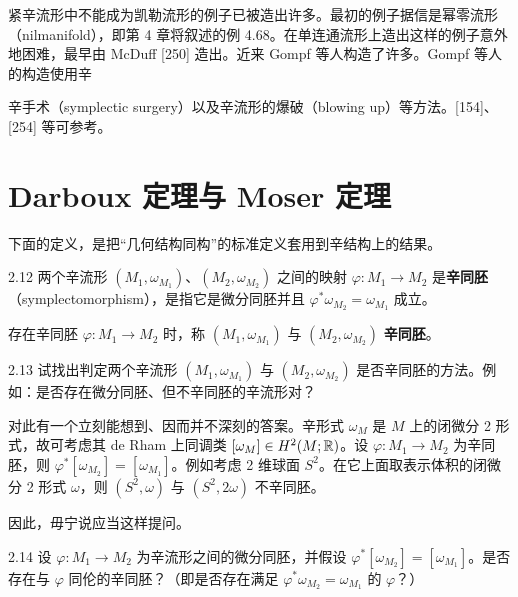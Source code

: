 紧辛流形中不能成为凯勒流形的例子已被造出许多。最初的例子据信是幂零流形（nilmanifold），即第 4 章将叙述的例 4.68。在单连通流形上造出这样的例子意外地困难，最早由 McDuff [250] 造出。近来 Gompf 等人构造了许多。Gompf 等人的构造使用辛

辛手术（symplectic surgery）以及辛流形的爆破（blowing up）等方法。[154]、[254] 等可参考。

\section{Darboux 定理与 Moser 定理}


下面的定义，是把“几何结构同构”的标准定义套用到辛结构上的结果。

\begin{definition}{2.12}
  两个辛流形 $(M_1,\omega_{M_1})$、$(M_2,\omega_{M_2})$ 之间的映射 $\varphi\colon M_1\to M_2$ 是\textbf{辛同胚}（symplectomorphism），是指它是微分同胚并且 $\varphi^*\omega_{M_2}=\omega_{M_1}$ 成立。

  存在辛同胚 $\varphi\colon M_1\to M_2$ 时，称 $(M_1,\omega_{M_1})$ 与 $(M_2,\omega_{M_2})$ \textbf{辛同胚}。
\end{definition}

\begin{problem}{2.13}
  试找出判定两个辛流形 $(M_1,\omega_{M_1})$ 与 $(M_2,\omega_{M_2})$ 是否辛同胚的方法。例如：是否存在微分同胚、但不辛同胚的辛流形对？
\end{problem}

对此有一个立刻能想到、因而并不深刻的答案。辛形式 $\omega_M$ 是 $M$ 上的闭微分 2 形式，故可考虑其 de Rham 上同调类 $[\omega_M]\in H^2(M;\mathbb{R})$。设 $\varphi\colon M_1\to M_2$ 为辛同胚，则 $\varphi^*[\omega_{M_2}]=[\omega_{M_1}]$。例如考虑 2 维球面 $S^2$。在它上面取表示体积的闭微分 2 形式 $\omega$，则 $(S^2,\omega)$ 与 $(S^2,2\omega)$ 不辛同胚。

因此，毋宁说应当这样提问。

\begin{problem}{2.14}
  设 $\varphi\colon M_1\to M_2$ 为辛流形之间的微分同胚，并假设 $\varphi^*[\omega_{M_2}]=[\omega_{M_1}]$。是否存在与 $\varphi$ 同伦的辛同胚？（即是否存在满足 $\varphi^*\omega_{M_2}=\omega_{M_1}$ 的 $\varphi$？）
\end{problem}


